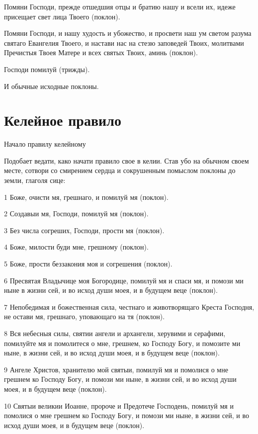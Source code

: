Помяни Господи, прежде отшедшия отцы и братию нашу и всели их, идеже присещает свет лица Твоего (поклон).

Помяни Господи, и нашу худость и убожество, и просвети наш ум светом разума святаго Евангелия Твоего, и настави нас на стезю заповедей Твоих, молитвами Пречистыя Твоея Матере и всех святых Твоих, аминь (поклон).

Господи помилуй (трижды). 

И обычные исходные поклоны.


\section{Келейное правило}
 


Начало правилу келейному

Подобает ведати, како начати правило свое в келии. Став убо на обычном своем месте, сотвори со смирением сердца и сокрушенным помыслом поклоны до земли, глаголя сице:

1 Боже, очисти мя, грешнаго, и помилуй мя (поклон).

2 Создавыи мя, Господи, помилуй мя (поклон).

3 Без числа согреших, Господи, прости мя (поклон).

4 Боже, милости буди мне, грешному (поклон).

5 Боже, прости беззакония моя и согрешения (поклон).

6 Пресвятая Владычице моя Богородице, помилуй мя и спаси мя, и помози ми ныне в жизни сей, и во исход души моея, и в будущем веце (поклон).

7 Непобедимая и божественная сила, честнаго и животворящаго Креста Господня, не остави мя, грешнаго, уповающаго на тя (поклон).

8 Вся небесныя силы, святии ангели и архангели, херувими и серафими, помилуйте мя и помолитеся о мне, грешнем, ко Господу Богу, и помозите ми ныне, в жизни сей, и во исход души моея, и в будущем веце (поклон).

9 Ангеле Христов, хранителю мой святыи, помилуй мя и помолися о мне грешнем ко Господу Богу, и помози ми ныне, в жизни сей, и во исход души моея, и в будущем веце (поклон).

10 Святыи великии Иоанне, пророче и Предотече Господень, помилуй мя и помолися о мне грешнем ко Господу Богу, и помози ми ныне, в жизни сей, и во исход души моея, и в будущем веце (поклон).

